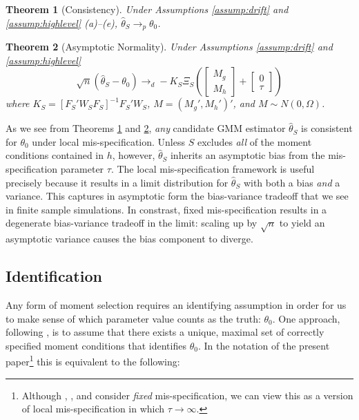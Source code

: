 \documentclass[12pt]{article}
\newtheorem{thm}{Theorem}[section]
\theoremstyle{definition}
\begin{document}
\begin{thm}[Consistency]
\label{thm:consist}
Under Assumptions \ref{assump:drift} and \ref{assump:highlevel} (a)--(e), $\widehat{\theta}_S \rightarrow_{p} \theta_0$.
\end{thm}

\begin{thm}[Asymptotic Normality]
\label{thm:normality}
Under Assumptions \ref{assump:drift} and \ref{assump:highlevel}
$$\sqrt{n}(\widehat{\theta}_S - \theta_0 ) \rightarrow_d -K_S \Xi_S  \left(\left[\begin{array}
	{c} M_g \\ M_h
\end{array} \right]  + \left[\begin{array}
	{c} 0 \\ \tau
\end{array} \right]\right)$$
where $K_S  = [F_S'W_SF_S]^{-1} F_S'W_S$, $M = (M_g', M_h')'$, and $M \sim N(0,\Omega)$.
\end{thm}

As we see from Theorems \ref{thm:consist} and \ref{thm:normality}, \emph{any} candidate GMM estimator $\widehat{\theta}_S$ is consistent for $\theta_0$ under local mis-specification. Unless $S$ excludes \emph{all} of the moment conditions contained in $h$, however, $\widehat{\theta}_S$ inherits an asymptotic bias from the mis-specification parameter $\tau$. The local mis-specification framework is useful precisely because it results in a limit distribution for $\widehat{\theta}_S$ with both a bias \emph{and} a variance. This captures in asymptotic form the bias-variance tradeoff that we see in finite sample simulations. In constrast, fixed mis-specification results in a degenerate bias-variance tradeoff in the limit: scaling up by $\sqrt{n}$ to yield an asymptotic variance causes the bias component to diverge.

\subsection{Identification}
Any form of moment selection requires an identifying assumption in order for us to make sense of which parameter value counts as the truth: $\theta_0$. One approach, following \cite{Andrews1999}, is to assume that there exists a unique, maximal set of correctly specified moment conditions that identifies $\theta_0$. In the notation of the present paper\footnote{Although \cite{Andrews1999}, \cite{AndrewsLu}, and \cite{HongPrestonShum} consider \emph{fixed} mis-specification, we can view this as a version of local mis-specification in which $\tau \rightarrow \infty$.}  this is equivalent to the following:
\end{document}
